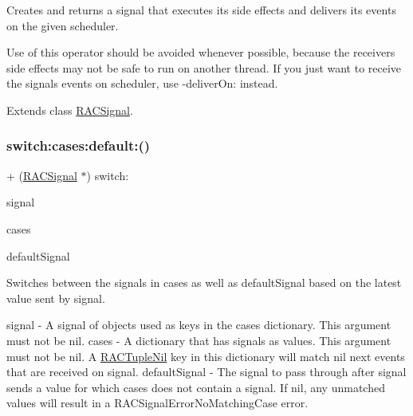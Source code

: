 Creates and returns a signal that executes its side effects and delivers its events on the given scheduler.

Use of this operator should be avoided whenever possible, because the receiver\textquotesingle{}s side effects may not be safe to run on another thread. If you just want to receive the signal\textquotesingle{}s events on {\ttfamily scheduler}, use -\/deliver\+On\+: instead. 

Extends class \mbox{\hyperlink{interface_r_a_c_signal_a6b8db542f7106880577a943cb8e9da90}{R\+A\+C\+Signal}}.

\mbox{\label{category_r_a_c_signal_07_operations_08_aac7816b22cfdcbe65cd43d99836ba1f5}} 
\subsubsection{\texorpdfstring{switch\+:cases\+:default\+:()}{switch:cases:default:()}\hspace{0.1cm}{\footnotesize\ttfamily [1/3]}}
{\footnotesize\ttfamily + (\mbox{\hyperlink{interface_r_a_c_signal}{R\+A\+C\+Signal}} $\ast$) switch\+: \begin{DoxyParamCaption}\item[{(\mbox{\hyperlink{interface_r_a_c_signal}{R\+A\+C\+Signal}} $\ast$)}]{signal }\item[{cases:(N\+S\+Dictionary $\ast$)}]{cases }\item[{default:(\mbox{\hyperlink{interface_r_a_c_signal}{R\+A\+C\+Signal}} $\ast$)}]{default\+Signal }\end{DoxyParamCaption}}

Switches between the signals in {\ttfamily cases} as well as {\ttfamily default\+Signal} based on the latest value sent by {\ttfamily signal}.

signal -\/ A signal of objects used as keys in the {\ttfamily cases} dictionary. This argument must not be nil. cases -\/ A dictionary that has signals as values. This argument must not be nil. A \mbox{\hyperlink{interface_r_a_c_tuple_nil}{R\+A\+C\+Tuple\+Nil}} key in this dictionary will match nil {\ttfamily next} events that are received on {\ttfamily signal}. default\+Signal -\/ The signal to pass through after {\ttfamily signal} sends a value for which {\ttfamily cases} does not contain a signal. If nil, any unmatched values will result in a R\+A\+C\+Signal\+Error\+No\+Matching\+Case error.

